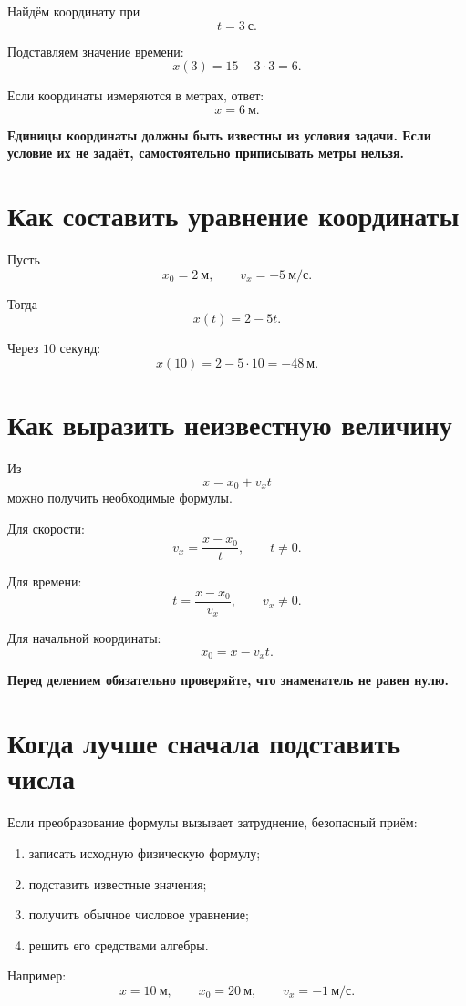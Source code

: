 \documentclass[a4paper,12pt]{article}
\newcommand{\important}[1]{\textbf{#1}}
\begin{document}
Найдём координату при
\[
t=3~\text{с}.
\]

Подставляем значение времени:
\[
x(3)=15-3\cdot3=6.
\]

Если координаты измеряются в метрах, ответ:
\[
\boxed{x=6~\text{м}}.
\]

\important{Единицы координаты должны быть известны из условия задачи. Если условие их не задаёт, самостоятельно приписывать метры нельзя.}

\section{Как составить уравнение координаты}

Пусть
\[
x_0=2~\text{м},
\qquad
v_x=-5~\text{м/с}.
\]

Тогда
\[
x(t)=2-5t.
\]

Через \(10\) секунд:
\[
x(10)=2-5\cdot10=-48~\text{м}.
\]

\section{Как выразить неизвестную величину}

Из
\[
x=x_0+v_xt
\]
можно получить необходимые формулы.

Для скорости:
\[
v_x=\frac{x-x_0}{t},
\qquad t\ne0.
\]

Для времени:
\[
t=\frac{x-x_0}{v_x},
\qquad v_x\ne0.
\]

Для начальной координаты:
\[
x_0=x-v_xt.
\]

\important{Перед делением обязательно проверяйте, что знаменатель не равен нулю.}

\section{Когда лучше сначала подставить числа}

Если преобразование формулы вызывает затруднение, безопасный приём:

\begin{enumerate}
  \item записать исходную физическую формулу;
  \item подставить известные значения;
  \item получить обычное числовое уравнение;
  \item решить его средствами алгебры.
\end{enumerate}

Например:
\[
x=10~\text{м},\qquad
x_0=20~\text{м},\qquad
v_x=-1~\text{м/с}.
\]
\end{document}
